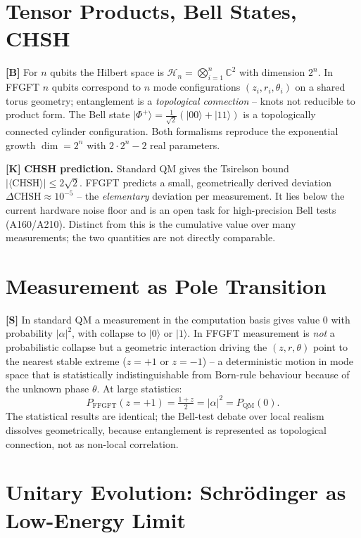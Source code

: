 \section{Tensor Products, Bell States, CHSH}

\textbf{[B]} For $n$ qubits the Hilbert space is
$\mathcal{H}_n = \bigotimes_{i=1}^n\mathbb{C}^2$ with dimension $2^n$. In FFGFT
$n$ qubits correspond to $n$ mode configurations $(z_i,r_i,\theta_i)$ on a
shared torus geometry; entanglement is a \emph{topological connection} -- knots
not reducible to product form. The Bell state $|\Phi^+\rangle =
\tfrac{1}{\sqrt2}(|00\rangle+|11\rangle)$ is a topologically connected cylinder
configuration. Both formalisms reproduce the exponential growth $\dim = 2^n$
with $2\cdot2^n-2$ real parameters.

\textbf{[K]} \textbf{CHSH prediction.} Standard QM gives the Tsirelson bound
$|\langle\text{CHSH}\rangle|\le 2\sqrt2$. FFGFT predicts a small, geometrically
derived deviation $\Delta\text{CHSH}\approx10^{-5}$ -- the \emph{elementary}
deviation per measurement. It lies below the current hardware noise floor and is
an open task for high-precision Bell tests (A160/A210). Distinct from this is the
cumulative value over many measurements; the two quantities are not directly
comparable.

\section{Measurement as Pole Transition}

\textbf{[S]} In standard QM a measurement in the computation basis gives value
$0$ with probability $|\alpha|^2$, with collapse to $|0\rangle$ or $|1\rangle$.
In FFGFT measurement is \emph{not} a probabilistic collapse but a geometric
interaction driving the $(z,r,\theta)$ point to the nearest stable extreme
($z=+1$ or $z=-1$) -- a deterministic motion in mode space that is
statistically indistinguishable from Born-rule behaviour because of the unknown
phase $\theta$. At large statistics:
\[
  P_{\text{FFGFT}}(z=+1) = \tfrac{1+z}{2} = |\alpha|^2 = P_{\text{QM}}(0).
\]
The statistical results are identical; the Bell-test debate over local realism
dissolves geometrically, because entanglement is represented as topological
connection, not as non-local correlation.

\section{Unitary Evolution: Schrödinger as Low-Energy Limit}

